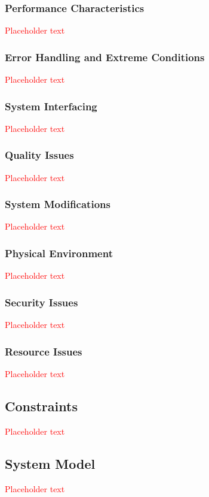 \documentclass[a4paper, 11pt, titlepage]{article}
\begin{document}
\subsubsection{Performance Characteristics}
\textcolor{red}{Placeholder text}

\subsubsection{Error Handling and Extreme Conditions}
\textcolor{red}{Placeholder text}

\subsubsection{System Interfacing}
\textcolor{red}{Placeholder text}

\subsubsection{Quality Issues}
\textcolor{red}{Placeholder text}

\subsubsection{System Modifications}
\textcolor{red}{Placeholder text}

\subsubsection{Physical Environment}
\textcolor{red}{Placeholder text}

\subsubsection{Security Issues}
\textcolor{red}{Placeholder text}

\subsubsection{Resource Issues}
\textcolor{red}{Placeholder text}

\subsection{Constraints}
\textcolor{red}{Placeholder text}

\subsection{System Model}
\textcolor{red}{Placeholder text}
\end{document}
